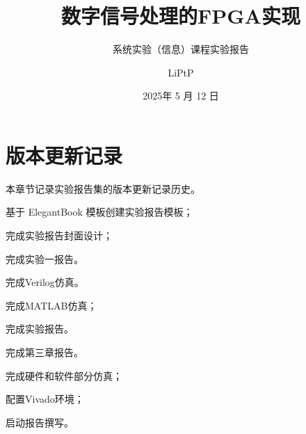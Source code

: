 \documentclass[lang=cn,newtx,10pt,scheme=chinese]{elegantbook}
\title{数字信号处理的FPGA实现}
\subtitle{系统实验（信息）课程实验报告}
\author{LiPtP}
\institute{吴健雄学院}
\date{2025年 5 月 12 日}
\begin{document}
\maketitle
\frontmatter

\tableofcontents

\mainmatter


\setcounter{chapter}{6}

% 

% 

% 

% 

% 

% 

% 


\appendix
\chapter{版本更新记录}
本章节记录实验报告集的版本更新记录历史。

\begin{change}
  \item 基于 ElegantBook 模板创建实验报告模板；
  \item 完成实验报告封面设计；
  \item 完成实验一报告。
\end{change}

\begin{change}
  \item 完成Verilog仿真。
\end{change}

\begin{change}
\item 完成MATLAB仿真；
\item 完成实验报告。
\end{change}

\begin{change}
\item 完成第三章报告。
\end{change}

\begin{change}
\item 完成硬件和软件部分仿真；
\item 配置Vivado环境；
\item 启动报告撰写。
\end{change}
\end{document}
